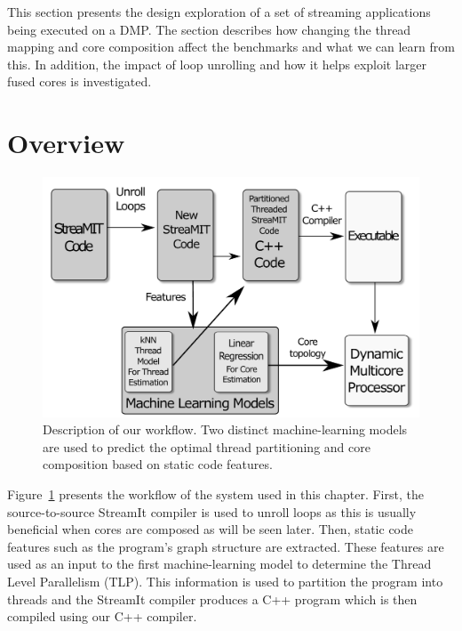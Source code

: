 This section presents the design exploration of a set of streaming applications being executed on a DMP.
The section describes how changing the thread mapping and core composition affect the benchmarks and what we can learn from this.
In addition, the impact of loop unrolling and how it helps exploit larger fused cores is investigated.

\section{Overview}

\begin{figure}
    \centering
    \includegraphics[width=1\textwidth]{streamit-paper/graphics/explanation.pdf}
    \caption{Description of our workflow.
    Two distinct machine-learning models are used to predict the optimal thread partitioning and core composition based on static code features.}
    \label{fig:overview}
\end{figure}

Figure~\ref{fig:overview} presents the workflow of the system used in this chapter.
First, the source-to-source StreamIt compiler is used to unroll loops as this is usually beneficial when cores are composed as will be seen later.
Then, static code features such as the program's graph structure are extracted.
These features are used as an input to the first machine-learning model to determine the Thread Level Parallelism (TLP).
This information is used to partition the program into threads and the StreamIt compiler produces a C++ program which  is then compiled using our C++ compiler.

